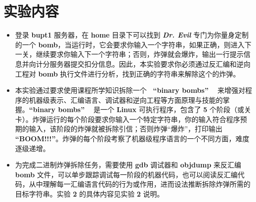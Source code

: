 \section{实验内容}
    \begin{itemize}
        \item 登录 \textbf{bupt1} 服务器，在 \textbf{home} 目录下可以找到 \textbf{\textit{Dr. Evil}} 专门为你量身定制的一个 \textbf{bomb}，当运行时，它会要求你输入一个字符串，如果正确，则进入下一关，继续要求你输入下一个字符串；否则，炸弹就会爆炸，输出一行提示信息并向计分服务器提交扣分信息。因此，本实验要求你必须通过反汇编和逆向工程对 \textbf{bomb} 执行文件进行分析，找到正确的字符串来解除这个的炸弹。
        \item 本实验通过要求使用课程所学知识拆除一个 \textbf{ \ “binary bombs” \ } 来增强对程序的机器级表示、汇编语言、调试器和逆向工程等方面原理与技能的掌握。\textbf{“binary bombs” \ } 是一个 \textbf{Linux} 可执行程序，包含了 \textbf{5} 个阶段（或关卡）。炸弹运行的每个阶段要求你输入一个特定字符串，你的输入符合程序预期的输入，该阶段的炸弹就被拆除引信；否则炸弹“爆炸”，打印输出 \textbf{“BOOM!!!”}。炸弹的每个阶段考察了机器级程序语言的一个不同方面，难度逐级递增。
        \item 为完成二进制炸弹拆除任务，需要使用 \textbf{gdb} 调试器和 \textbf{objdump} 来反汇编 \textbf{bomb} 文件，可以单步跟踪调试每一阶段的机器代码，也可以阅读反汇编代码，从中理解每一汇编语言代码的行为或作用，进而设法推断拆除炸弹所需的目标字符串。实验 \textbf{2} 的具体内容见实验 \textbf{2} 说明。
    \end{itemize}